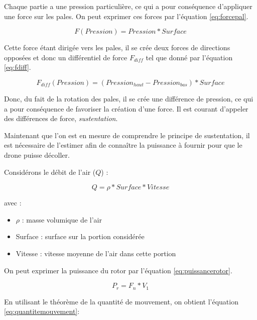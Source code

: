 \documentclass[a4paper,10pt]{report}
\begin{document}
	Chaque partie a une pression particulière, ce qui a pour conséquence 
d'appliquer une force sur les pales. On peut exprimer ces forces par l'équation 
\ref{eq:forcepal}.

	\begin{equation}
	  \label{eq:forcepal}
	  F(Pression) = Pression * Surface 
	\end{equation}

	Cette force étant dirigée vers les pales, il se crée deux forces de 
directions opposées et donc un différentiel de force $F_{diff}$ tel que donné 
par l'équation \ref{eq:fdiff}.

	\begin{equation}
	  \label{eq:fdiff}
	  F_{diff}(Pression) = (Pression_{haut} - Pression_{bas}) * Surface
	\end{equation}

	Donc, du fait de la rotation des pales, il se crée une différence de 
pression, ce qui a pour conséquence de favoriser la création d'une force. 
Il est courant d'appeler des différences de force, \textit{sustentation}.

	Maintenant que l'on est en mesure de comprendre le principe de 
sustentation, il est nécessaire de l'estimer afin de connaître la 
puissance à fournir pour que le drone puisse décoller. 

	Considérons le débit de l'air ($Q$) :
	
	\begin{equation}
	  \label{eq:debit}
	  Q = \rho * Surface * Vitesse
	\end{equation}
	
	avec :
	
	\begin{itemize}
	  \item $\rho$ : masse volumique de l'air
	  \item Surface : surface sur la portion considérée
	  \item Vitesse : vitesse moyenne de l'air dans cette portion
	\end{itemize}
	
	On peut exprimer la puissance du rotor par l'équation 
\ref{eq:puissancerotor}.
	
	\begin{equation}
	  \label{eq:puissancerotor}
	  P_{r} = F_{n} * V_{1} 
	\end{equation}
	
	En utilisant le théorème de la quantité de 
mouvement\cite{thquantmouvement}, on obtient l'équation 
\ref{eq:quantitemouvement}:
\end{document}
